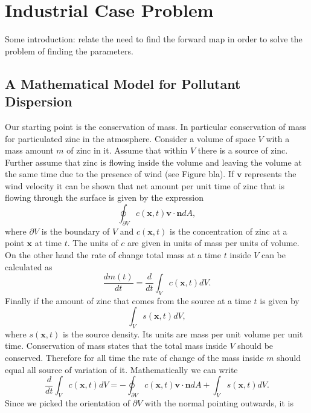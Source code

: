 \documentclass[12pt]{book}
\newcommand{\x}{\textbf{x}}
\begin{document}
\chapter{Industrial Case Problem}

Some introduction: relate the need to find the forward map in order to solve the problem
of finding the parameters. 

\section{A Mathematical Model for Pollutant Dispersion}
Our starting point is the conservation of mass. In particular conservation of mass for
particulated zinc in the atmosphere. Consider a volume of space $V$ with a mass
amount $m$ of zinc in it. Assume
that within $V$ there is  a source of  zinc. Further assume that zinc is flowing inside the volume 
and leaving the volume at the same time due to the presence of wind (see Figure bla).
If $\textbf{v}$ represents the wind velocity it can be shown that net amount
per unit time of zinc that is flowing through the surface is given by the expression
\cite{seinfeld1998atmospheric}
\begin{equation*}
\oint_{\partial V}c(\x,t)\textbf{v}\cdot\textbf{n}dA,
\end{equation*}
where $\partial V$ is the boundary of $V$ and $c(\x,t)$ is the concentration of zinc at a point $\x$
at time $t$.
The units of $c$ are given in units of mass per units of volume. On the other hand
the rate of change total mass at a time $t$ inside $V$  can be calculated as
\begin{equation*}
\frac{dm(t)}{dt}=\frac{d}{dt}\int_{V}c(\x,t)dV.
\end{equation*}
Finally if the amount of zinc that comes from the source at a time $t$ is given by
\begin{equation*}
\int_{V}s(\x,t)dV,
\end{equation*}
where $s(\x,t)$ is the source density. Its units are mass per unit volume per unit time.
Conservation of mass states that the total mass inside $V$ should be conserved. Therefore
for all time the rate of change of the mass inside $m$ should equal all source of variation of it.
Mathematically we can write
\begin{equation*}
\frac{d}{dt}\int_{V}c(\x,t)dV=-\oint_{\partial V}c(\x,t)\textbf{v}\cdot\textbf{n}dA+\int_{V}s(\x,t)dV.
\end{equation*}
Since we picked the orientation of $\partial V$ with the normal pointing outwards, it is
\end{document}
